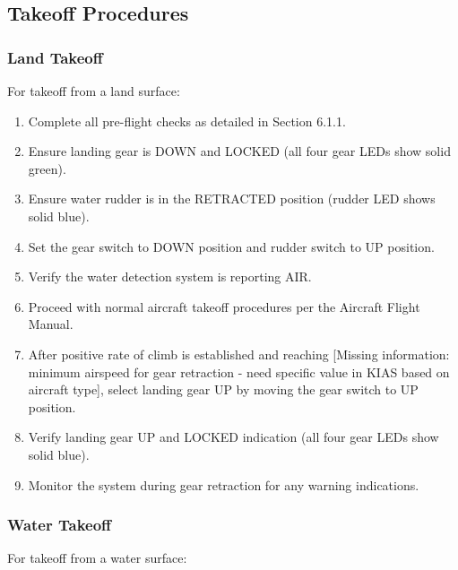 \documentclass[12pt,a4paper,twoside,openright]{book}
\begin{document}
\subsection{Takeoff Procedures}

\subsubsection{Land Takeoff}
For takeoff from a land surface:

\begin{enumerate}
    \item Complete all pre-flight checks as detailed in Section 6.1.1.
    \item Ensure landing gear is DOWN and LOCKED (all four gear LEDs show solid green).
    \item Ensure water rudder is in the RETRACTED position (rudder LED shows solid blue).
    \item Set the gear switch to DOWN position and rudder switch to UP position.
    \item Verify the water detection system is reporting AIR.
    \item Proceed with normal aircraft takeoff procedures per the Aircraft Flight Manual.
    \item After positive rate of climb is established and reaching {\color{red}[Missing information: minimum airspeed for gear retraction - need specific value in KIAS based on aircraft type]}, select landing gear UP by moving the gear switch to UP position.
    \item Verify landing gear UP and LOCKED indication (all four gear LEDs show solid blue).
    \item Monitor the system during gear retraction for any warning indications.
\end{enumerate}

\subsubsection{Water Takeoff}
For takeoff from a water surface:
\end{document}
